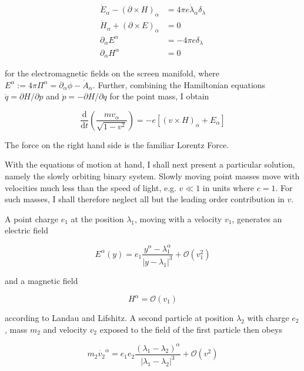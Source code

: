 \documentclass[11pt]{article}
\begin{document}
\begin{align}
	\dot{E}_\alpha - \left(\partial \times H \right)_\alpha &= 4 \pi e 
	\dot{\lambda}_\alpha \delta_\lambda\\
		\dot{H}_\alpha +  \left( \partial \times E \right)_\alpha &= 0
		\label{eom_em_2} \\
	\partial_\alpha E^\alpha &= - 4 \pi e \delta_\lambda
	\label{eom_em_3} \\ 
	\partial_\alpha H^\alpha &= 0
\end{align}

for the electromagnetic fields on the screen manifold, where $E^\alpha := 4 \pi \Pi^\alpha = \partial_\alpha \phi - \dot{A}_\alpha $. Further, combining the Hamiltonian equations $\dot{q} = \partial H / \partial p$ and $\dot{p} = - \partial H / \partial q$ for the point mass, I obtain 

\begin{equation}
	\frac{\mathrm{d}}{\mathrm{d}t} 
	\left( \frac{m v_\alpha}{\sqrt{1 - v^2 }}\right)
	= -e \left[ \left(v \times H \right)_\alpha + E_\alpha \right] 
\end{equation} 

The force on the right hand side is the familiar Lorentz Force.

With the equations of motion at hand, I shall next present a particular solution, namely the slowly orbiting binary system. Slowly moving point masses move with velocities much less than the speed of light, e.g.  $ v \ll 1 $ in units where $c = 1$. For such masses, I shall therefore neglect all but the leading order contribution in $v$.

A point charge $e_1$ at the position $\lambda_1$, moving with a velocity $v_1$, generates an electric field 

\begin{equation}
	E^\alpha(y) = e_1 \frac{y^\alpha - \lambda_1^\alpha }{\left| y - \lambda_1\right|^3} 
	+ \mathcal{O}\left(v_1^2 \right)
\end{equation}

and a magnetic field

\begin{equation}
	H^\alpha = \mathcal{O}\left(v_1 \right)
\end{equation}

according to Landau and Lifshitz. A second particle at position $\lambda_2$ with charge $e_2$, mass $m_2$ and velocity $v_2$ exposed to the field of the first particle then obeys 

\begin{equation} \label{eom_pp_newt}
	m_2 \dot{v_2}^\alpha = e_1 e_2 \frac{\left( \lambda_1 - \lambda_2\right)^\alpha}{\left| \lambda_1 - \lambda_2\right|^3} + \mathcal{O}\left(v^2\right)
\end{equation}
\end{document}
